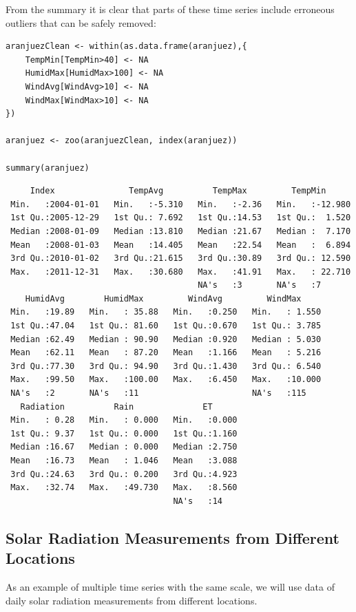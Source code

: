 \documentclass[smallroyalvopaper]{memoir}
\begin{document}

From the summary it is clear that parts of these time series include erroneous outliers that can be
safely removed:
\lstset{language=r,label= ,caption= ,captionpos=b,numbers=none}
\begin{lstlisting}
aranjuezClean <- within(as.data.frame(aranjuez),{
    TempMin[TempMin>40] <- NA
    HumidMax[HumidMax>100] <- NA
    WindAvg[WindAvg>10] <- NA
    WindMax[WindMax>10] <- NA
})

aranjuez <- zoo(aranjuezClean, index(aranjuez))

summary(aranjuez)
\end{lstlisting}

\begin{verbatim}
     Index               TempAvg          TempMax         TempMin       
 Min.   :2004-01-01   Min.   :-5.310   Min.   :-2.36   Min.   :-12.980  
 1st Qu.:2005-12-29   1st Qu.: 7.692   1st Qu.:14.53   1st Qu.:  1.520  
 Median :2008-01-09   Median :13.810   Median :21.67   Median :  7.170  
 Mean   :2008-01-03   Mean   :14.405   Mean   :22.54   Mean   :  6.894  
 3rd Qu.:2010-01-02   3rd Qu.:21.615   3rd Qu.:30.89   3rd Qu.: 12.590  
 Max.   :2011-12-31   Max.   :30.680   Max.   :41.91   Max.   : 22.710  
                                       NA's   :3       NA's   :7        
    HumidAvg        HumidMax         WindAvg         WindMax      
 Min.   :19.89   Min.   : 35.88   Min.   :0.250   Min.   : 1.550  
 1st Qu.:47.04   1st Qu.: 81.60   1st Qu.:0.670   1st Qu.: 3.785  
 Median :62.49   Median : 90.90   Median :0.920   Median : 5.030  
 Mean   :62.11   Mean   : 87.20   Mean   :1.166   Mean   : 5.216  
 3rd Qu.:77.30   3rd Qu.: 94.90   3rd Qu.:1.430   3rd Qu.: 6.540  
 Max.   :99.50   Max.   :100.00   Max.   :6.450   Max.   :10.000  
 NA's   :2       NA's   :11                       NA's   :115     
   Radiation          Rain              ET       
 Min.   : 0.28   Min.   : 0.000   Min.   :0.000  
 1st Qu.: 9.37   1st Qu.: 0.000   1st Qu.:1.160  
 Median :16.67   Median : 0.000   Median :2.750  
 Mean   :16.73   Mean   : 1.046   Mean   :3.088  
 3rd Qu.:24.63   3rd Qu.: 0.200   3rd Qu.:4.923  
 Max.   :32.74   Max.   :49.730   Max.   :8.560  
                                  NA's   :14
\end{verbatim}


\subsection{Solar Radiation Measurements from Different Locations}
\label{sec:org3b3fba5}
As an example of multiple time series with the same scale, we will use
data of daily solar radiation measurements from different locations.
\end{document}
